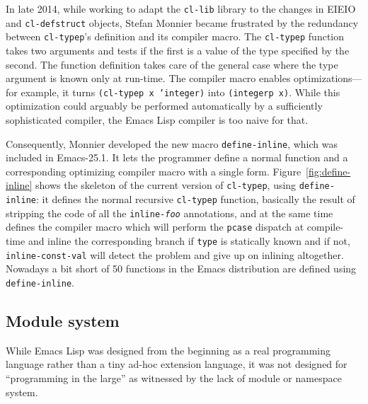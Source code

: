 \documentclass[format=acmsmall, review]{acmart}
\newcommand \Elisp {Emacs Lisp}
\begin{document}
In late 2014, while working to adapt the \texttt{cl-lib} library to the
changes in EIEIO and \texttt{cl-defstruct} objects, Stefan Monnier became
frustrated by the redundancy between \texttt{cl-typep}'s definition and its
compiler macro.
The \texttt{cl-typep} function takes two arguments and tests if the first is
a value of the type specified by the second.  The function definition takes
care of the general case where the type argument is known only at run-time.
The compiler macro enables optimizations---for example, it turns
\texttt{(cl-typep x 'integer)} into \texttt{(integerp x)}.  While this
optimization could arguably be performed automatically by a sufficiently
sophisticated compiler, the \Elisp{} compiler is too naive for that.

Consequently, Monnier developed the new macro \texttt{define-inline}, which
was included in Emacs-25.1.  It lets the programmer define a normal function
and a corresponding optimizing compiler macro with a single form.
Figure~\ref{fig:define-inline} shows the skeleton of the current version of
\texttt{cl-typep}, using \texttt{define-inline}: it defines the normal
recursive \texttt{cl-typep} function, basically the result of stripping the
code of all the \texttt{inline-\textit{foo}} annotations, and at the same
time defines the compiler macro which will perform the \texttt{pcase}
dispatch at
compile-time and inline the corresponding branch if \texttt{type} is
statically known and if not, \texttt{inline-const-val} will detect
the problem and give up on inlining altogether.  Nowadays a bit short of 50
functions in the Emacs distribution are defined using
\texttt{define-inline}.



\subsection{Module system}
\label{sec:module-system}

While \Elisp{} was designed from the beginning as a real programming
language rather than a tiny ad-hoc extension language, it was not designed
for ``programming in the large'' as witnessed by the lack of module or
namespace system.
\end{document}
